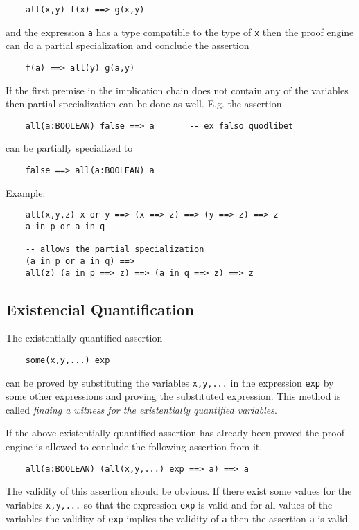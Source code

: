 \begin{lstlisting}
    all(x,y) f(x) ==> g(x,y)
\end{lstlisting}
and the expression \lstinline!a! has a type compatible to the type of
\lstinline!x! then the proof engine can do a partial specialization and
conclude the assertion

\begin{lstlisting}
    f(a) ==> all(y) g(a,y)
\end{lstlisting}

If the first premise in the implication chain does not contain any of the
variables then partial specialization can be done as well. E.g. the assertion
\begin{lstlisting}
    all(a:BOOLEAN) false ==> a       -- ex falso quodlibet
\end{lstlisting}
can be partially specialized to
\begin{lstlisting}
    false ==> all(a:BOOLEAN) a
\end{lstlisting}


\noindent Example:
\begin{lstlisting}
    all(x,y,z) x or y ==> (x ==> z) ==> (y ==> z) ==> z
    a in p or a in q

    -- allows the partial specialization
    (a in p or a in q) ==>
    all(z) (a in p ==> z) ==> (a in q ==> z) ==> z
\end{lstlisting}


\subsection{Existencial Quantification}

The existentially quantified assertion
%
\begin{lstlisting}
    some(x,y,...) exp
\end{lstlisting}
%
can be proved by substituting the variables \lstinline!x,y,...! in the
expression \lstinline!exp! by some other expressions and proving the
substituted expression. This method is called {\em finding a witness for the
existentially quantified variables}.

If the above existentially quantified assertion has already been proved the
proof engine is allowed to conclude the following assertion from it.
\begin{lstlisting}
    all(a:BOOLEAN) (all(x,y,...) exp ==> a) ==> a
\end{lstlisting}
The validity of this assertion should be obvious. If there exist some values
for the variables \lstinline!x,y,...! so that the expression \lstinline!exp!
is valid and for all values of the variables the validity of \lstinline!exp!
implies the validity of \lstinline!a! then the assertion \lstinline!a! is
valid.



